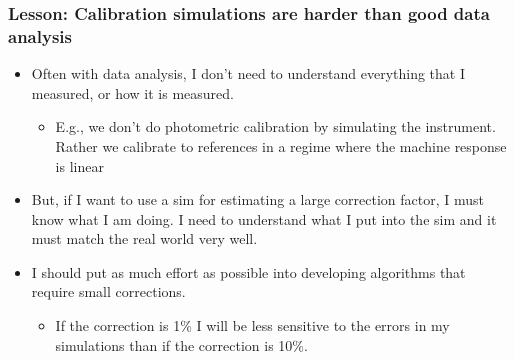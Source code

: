 \documentclass{beamer}
\begin{document}
\frame
{

    \frametitle{Lesson: Calibration simulations are harder than good data analysis}


    \begin{itemize}

        \item Often with data analysis, I don't need to understand everything that
            I measured, or how it is measured.

            \begin{itemize}

                \item E.g., we don't do photometric calibration by simulating the
                    instrument.  Rather we calibrate to references in a regime
                    where the machine response is linear

            \end{itemize}


        \item But, if I want to use a sim for estimating a large correction
            factor, I must know what I am doing. I need to understand what I
            put into the sim and it must match the real world very well.

        \item I should put as much effort as possible into developing
            algorithms that require small corrections.

            \begin{itemize}
    
                \item If the correction is 1\% I will be less sensitive to the errors in
                    my simulations than if the correction is 10\%.

            \end{itemize}

    \end{itemize}

}
\end{document}
